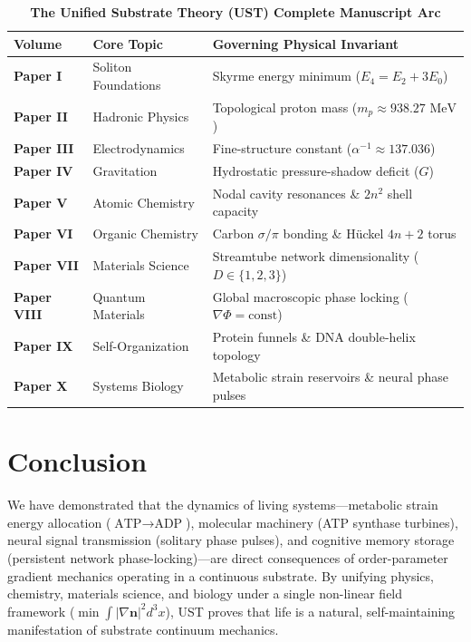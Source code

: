 \documentclass[11pt,a4paper]{article}
\begin{document}
	\begin{table}[htbp]
		\centering
		\caption{\textbf{The Unified Substrate Theory (UST) Complete Manuscript Arc}}
		\begin{tabular}{lll}
			\toprule
			\textbf{Volume} & \textbf{Core Topic} & \textbf{Governing Physical Invariant} \\
			\midrule
			\textbf{Paper I} & Soliton Foundations & Skyrme energy minimum ($E_4 = E_2 + 3E_0$) \\
			\textbf{Paper II} & Hadronic Physics & Topological proton mass ($m_p \approx 938.27 \text{ MeV}$) \\
			\textbf{Paper III} & Electrodynamics & Fine-structure constant ($\alpha^{-1} \approx 137.036$) \\
			\textbf{Paper IV} & Gravitation & Hydrostatic pressure-shadow deficit ($G$) \\
			\textbf{Paper V} & Atomic Chemistry & Nodal cavity resonances \& $2n^2$ shell capacity \\
			\textbf{Paper VI} & Organic Chemistry & Carbon $\sigma/\pi$ bonding \& Hückel $4n+2$ torus \\
			\textbf{Paper VII} & Materials Science & Streamtube network dimensionality ($D \in \{1,2,3\}$) \\
			\textbf{Paper VIII} & Quantum Materials & Global macroscopic phase locking ($\nabla \Phi = \text{const}$) \\
			\textbf{Paper IX} & Self-Organization & Protein funnels \& DNA double-helix topology \\
			\textbf{Paper X} & Systems Biology & Metabolic strain reservoirs \& neural phase pulses \\
			\bottomrule
		\end{tabular}
		\label{tab:ust_ten_paper_summary}
	\end{table}
	
	\section{Conclusion}
	\label{sec:conclusion}
	
	We have demonstrated that the dynamics of living systems—metabolic strain energy allocation ($\text{ATP} \to \text{ADP}$), molecular machinery (ATP synthase turbines), neural signal transmission (solitary phase pulses), and cognitive memory storage (persistent network phase-locking)—are direct consequences of order-parameter gradient mechanics operating in a continuous substrate. By unifying physics, chemistry, materials science, and biology under a single non-linear field framework ($\min \int |\nabla \mathbf{n}|^2 d^3x$), UST proves that life is a natural, self-maintaining manifestation of substrate continuum mechanics.
	
\end{document}
